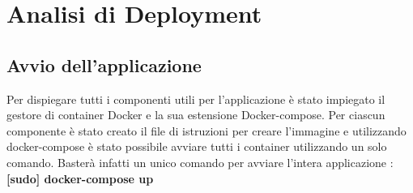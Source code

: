 

\chapter{Analisi di Deployment}
\section{Avvio dell'applicazione}
Per dispiegare tutti i componenti utili per l’applicazione è stato impiegato il
gestore di container Docker e la sua estensione Docker-compose.
Per ciascun componente è stato creato il file di istruzioni per creare l’immagine
e utilizzando docker-compose è stato possibile avviare tutti i container utilizzando un solo comando.
Basterà infatti un unico comando per avviare l'intera applicazione : \textbf{[sudo] docker-compose up}

